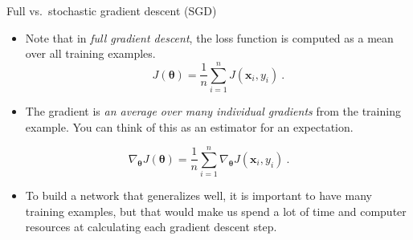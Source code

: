\documentclass[
  10pt,
  ignorenonframetext,
]{beamer}
\providecommand{\tightlist}{%
  \setlength{\itemsep}{0pt}\setlength{\parskip}{0pt}}
\begin{document}
\begin{frame}
\begin{block}{Full vs.~stochastic gradient descent (SGD)}
\protect\hypertarget{full-vs.-stochastic-gradient-descent-sgd}{}
\(~\)

\begin{itemize}
\item
  Note that in \emph{full gradient descent}, the loss function is
  computed as a mean over all training examples. \[
  J({\boldsymbol \theta})=\frac{1}{n}\sum_{i=1}^n J({\boldsymbol x}_i, y_i) \ .
  \]
\item
  The gradient is \emph{an average over many individual gradients} from
  the training example. You can think of this as an estimator for an
  expectation.
\end{itemize}

\[
\nabla_{\boldsymbol \theta} J({\boldsymbol \theta})=\frac{1}{n}\sum_{i=1}^n \nabla_{\boldsymbol \theta} J({\boldsymbol x}_i, y_i) \ .
\]

\begin{itemize}
\tightlist
\item
  To build a network that generalizes well, it is important to have many
  training examples, but that would make us spend a lot of time and
  computer resources at calculating each gradient descent step.
\end{itemize}
\end{block}
\end{frame}
\end{document}
